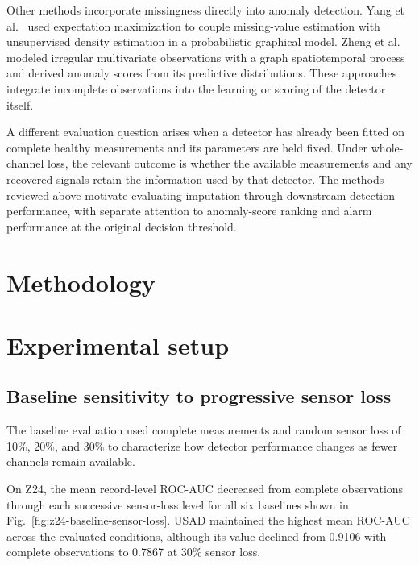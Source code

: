 \documentclass[a4paper,fleqn]{cas-sc}
\begin{document}
Other methods incorporate missingness directly into anomaly detection. Yang et al.\ \cite{yang2023probabilistic} used expectation maximization to couple missing-value estimation with unsupervised density estimation in a probabilistic graphical model. Zheng et al.\ \cite{zheng2024gstpro} modeled irregular multivariate observations with a graph spatiotemporal process and derived anomaly scores from its predictive distributions. These approaches integrate incomplete observations into the learning or scoring of the detector itself.

A different evaluation question arises when a detector has already been fitted on complete healthy measurements and its parameters are held fixed. Under whole-channel loss, the relevant outcome is whether the available measurements and any recovered signals retain the information used by that detector. The methods reviewed above motivate evaluating imputation through downstream detection performance, with separate attention to anomaly-score ranking and alarm performance at the original decision threshold.

\section{Methodology}
\label{sec:methods}


\section{Experimental setup}
\label{sec:experimental-setup}


\subsection{Baseline sensitivity to progressive sensor loss}
\label{subsec:baseline-sensor-loss}

The baseline evaluation used complete measurements and random sensor loss of 10\%, 20\%, and 30\% to characterize how detector performance changes as fewer channels remain available.

On Z24, the mean record-level ROC-AUC decreased from complete observations through each successive sensor-loss level for all six baselines shown in Fig.~\ref{fig:z24-baseline-sensor-loss}. USAD maintained the highest mean ROC-AUC across the evaluated conditions, although its value declined from 0.9106 with complete observations to 0.7867 at 30\% sensor loss.
\end{document}
